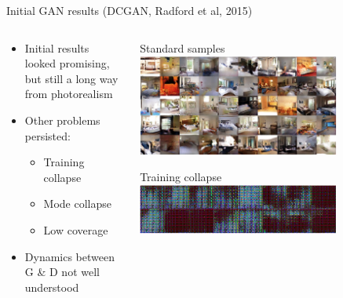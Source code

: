 \documentclass[8pt,xcolor=table,aspectratio=169]{beamer}
\begin{document}
\begin{frame}{Initial GAN results (DCGAN, Radford et al, 2015)}

\begin{columns}
\begin{column}{0.5\textwidth}

\begin{itemize}
\item Initial results looked promising, but still a long way from photorealism

\vspace{2em}

\item Other problems persisted:
\begin{itemize}
\item Training collapse
\item Mode collapse
\item Low coverage

\end{itemize}

\vspace{2em}

\item Dynamics between G \& D not well understood

\end{itemize}

\end{column}
\begin{column}{0.5\textwidth}
\centering
Standard samples\\
\includegraphics[width=0.75\textwidth]{ayYEUKy.jpg}
\vspace{0.5em}

Training collapse\\
\includegraphics[width=0.75\textwidth]{fw7jvWk.png}
\vspace{0.5em}


\end{column}
\end{columns}
\end{frame}
\end{document}
